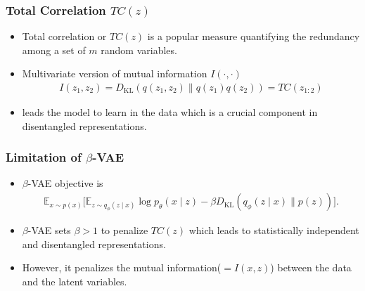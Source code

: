 \documentclass[10pt,mathserif]{beamer}
\begin{document}
\begin{frame}
\frametitle{Total Correlation $TC(z)$}
\begin{itemize}\itemsep=20pt
\item Total correlation or $TC(z)$ is a popular measure quantifying the redundancy among a set of $m$ random variables. \pause
\item Multivariate version of mutual information $I(\cdot, \cdot)$
\begin{align}
I(z_1,z_2)= D_\text{KL}(q(z_1,z_2) \parallel q(z_1)q(z_2))=TC(z_{1:2})\nonumber
\end{align}
        \vspace{-2em}
\pause \item {\color{blue}{Penalizing TC}} leads the model to learn {\color{blue}{statistically independent factors}} in the data which is a crucial component in disentangled representations. 
\end{itemize}
\end{frame}

\begin{frame}
\frametitle{Limitation of $\beta$-VAE}
\begin{itemize}\itemsep=20pt
\item $\beta$-VAE objective is
\begin{align}
\mathbb{E}_{x \sim p(x)} \big[\mathbb{E}_{z \sim q_\phi(z \mid x)} \log p_\theta(x \mid z)- \beta D_\text{KL}\left(q_\phi(z \mid x) \parallel p(z)\right)\big].\nonumber
\end{align}
\item $\beta$-VAE sets $\beta > 1$ to penalize $TC(z)$ which leads to statistically independent and disentangled representations. \pause
\item However, it penalizes the mutual information($=I(x,z)$) between the data and the latent variables. 
\end{itemize}
\end{frame}
\end{document}
